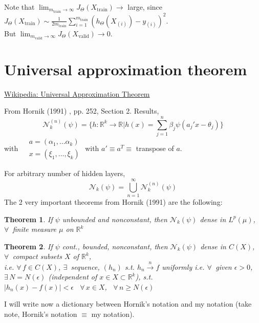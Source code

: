 \documentclass[10pt]{amsart}
\newtheorem{theorem}{Theorem}
\begin{document}
\begin{multicols*}{2}
Note that $\lim_{m_{\text{train}}\to \infty} J_{\Theta}(X_{\text{train}}) \to $ large, since $J_{\Theta}(X_{\text{train}}) \sim \frac{1}{2m_{\text{train}}} \sum_{i=1}^{m_{\text{train}}} (h_{\Theta}(X_{(i)}) -y_{(i)})^2$.  \\
But $\lim_{m_{\text{valid}} \to \infty} J_{\Theta}(X_{\text{valid}}) \to 0$.  




\section{Universal approximation theorem}

\href{https://en.wikipedia.org/wiki/Universal_approximation_theorem}{Wikipedia: Universal Approximation Theorem}

From Hornik (1991) \cite{Horn1991}, pp. 252, Section 2. Results,
\begin{equation}
  \mathcal{N}_k^{(n)}(\psi)  = \lbrace h :\mathbb{R}^k \to \mathbb{R} | h(x) =\sum_{j=1}^n \beta_j \psi(a_j'x- \theta_j) \rbrace
\end{equation}
with
$\begin{aligned}
  & a = (\alpha_1 , \dots \alpha_k) \\ 
 & x = ( \xi_1, \dots, \xi_k) 
  \end{aligned}
$ with $a' \equiv a^T \equiv $ transpose of $a$.  

For arbitrary number of hidden layers,
\[
\mathcal{N}_k(\psi) = \bigcup_{n=1}^{\infty}\mathcal{N}_k^{(n)}(\psi)
\]
The 2 very important theorems from Hornik (1991) are the following:
\begin{theorem}
If $\psi$ unbounded and nonconstant, then $\mathcal{N}_k(\psi)$ dense in $L^p(\mu)$, $\forall \, $ finite measure $\mu$ on $\mathbb{R}^k$
\end{theorem}
\begin{theorem}
  If $\psi$ cont., bounded, nonconstant, then $\mathcal{N}_k(\psi)$ dense in $C(X)$, \, $\forall \,$ compact subsets $X$ of $\mathbb{R}^k$, \\
  i.e. $\forall \, f\in C(X)$, $\exists \, $ sequence, $(h_n)$ s.t. $h_n \xrightarrow{n} f$ uniformly i.e. $\forall \, $ given $\epsilon >0$, $\exists \, N=N(\epsilon)$ (independent of $x\in X\subset \mathbb{R}^k$), s.t. \\
  $|h_n(x)-f(x)| < \epsilon$ \, $\forall \, x \in X$, \, $\forall \, n \geq N(\epsilon)$
  \end{theorem}
I will write now a dictionary between Hornik's notation and my notation (take note, Hornik's notation $\equiv$ my notation).  


\end{multicols*}
\end{document}
